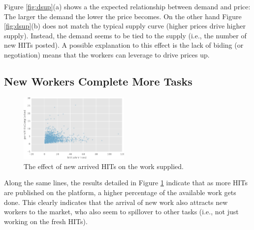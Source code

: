 Figure \ref{fig:dsup}(a) shows a the expected relationship between demand and price: The larger the demand the lower the price becomes. On the other hand Figure \ref{fig:dsup}(b)  does not match the typical supply curve (higher prices drive higher supply). Instead, the demand seems to be tied to  the supply (i.e., the number of new HITs posted). A possible explanation to this effect is the lack of biding (or negotiation) means that the workers can leverage to drive prices up.

\subsection{New Workers Complete More Tasks}
\begin{figure}[tb]
	\centering
		\includegraphics[width=0.48\textwidth]{figures/percHitsCompleted}
	\caption{The effect of new arrived HITs on the work  supplied.}
	\label{fig:perc_hits_completed}
\end{figure}
Along the same lines, the results detailed in Figure \ref{fig:perc_hits_completed} indicate that as more HITs are published on the platform, a higher percentage of the available work gets done. 
This clearly indicates that the arrival of new work also attracts new workers
to the market, who also seem to spillover to other tasks (i.e., not just working on the fresh HITs).

